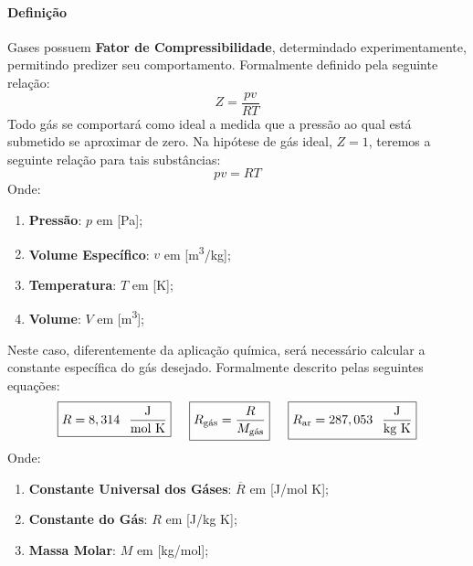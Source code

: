 \documentclass{article}
\begin{document}
            \paragraph{Definição}Gases possuem \textbf{Fator de Compressibilidade}, determindado experimentamente, permitindo predizer seu comportamento. Formalmente definido pela seguinte relação:
                \[\boxed{Z = \frac{pv}{RT}}\]
            Todo gás se comportará como ideal a medida que a pressão ao qual está submetido se aproximar de zero. Na hipótese de gás ideal, $Z = 1$, teremos a seguinte relação para tais substâncias:
                \[
                    \boxed{pv = RT}
                \]
            Onde:
                \begin{enumerate}[noitemsep]
                    \item \textbf{Pressão}: $p$ em [Pa];
                    \item \textbf{Volume Específico}: $v$ em [m\textsuperscript{3}/kg];
                    \item \textbf{Temperatura}: $T$ em [K];
                    \item \textbf{Volume}: $V$ em [m\textsuperscript{3}];
                \end{enumerate}
            Neste caso, diferentemente da aplicação química, será necessário calcular a constante específica do gás desejado. Formalmente descrito pelas seguintes equações:
                \[
                    \boxed{R = 8,314 \hspace{2.5mm} \frac{\text{J}}{\text{mol K}}} \hspace{5mm}
                    \boxed{R_{\text{gás}} = \frac{R}{M_{\text{gás}}}} \hspace{5mm}
                    \boxed{R_{\text{ar}} = 287,053 \hspace{2.5mm} \frac{\text{J}}{\text{kg K}}}
                \]
            Onde: 
                \begin{enumerate}[noitemsep]
                    \item \textbf{Constante Universal dos Gáses}: $\overline{R}$ em [J/mol K];
                    \item \textbf{Constante do Gás}: $R$ em [J/kg K];
                    \item \textbf{Massa Molar}: $M$ em [kg/mol];
                \end{enumerate}
\end{document}

